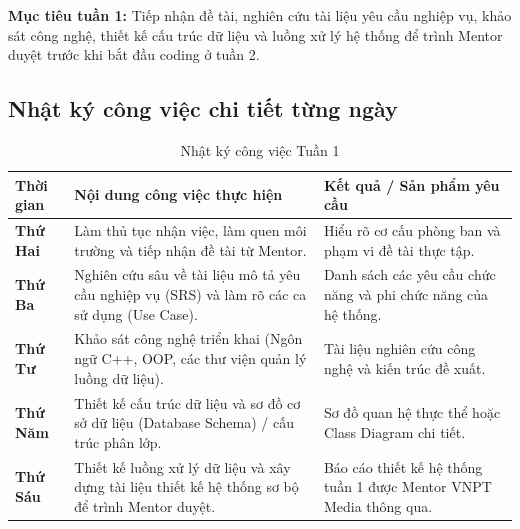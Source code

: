 \documentclass[12pt,a4paper]{article}
\begin{document}
\begin{weekframe}
\textbf{Mục tiêu tuần 1:} Tiếp nhận đề tài, nghiên cứu tài liệu yêu cầu nghiệp vụ, khảo sát công nghệ, thiết kế cấu trúc dữ liệu và luồng xử lý hệ thống để trình Mentor duyệt trước khi bắt đầu coding ở tuần 2.
\end{weekframe}

\vspace{0.5cm}

\subsection{Nhật ký công việc chi tiết từng ngày}

\begin{table}[H]
    \centering
    \renewcommand{\arraystretch}{1.6}
    \begin{tabularx}{\textwidth}{|>{\bfseries\centering\arraybackslash}p{2cm}|>{\arraybackslash}X|>{\arraybackslash}p{4.5cm}|}
        \hline
        \rowcolor{lightblue}
        \textbf{Thời gian} & \textbf{Nội dung công việc thực hiện} & \textbf{Kết quả / Sản phẩm yêu cầu} \\
        \hline
        Thứ Hai &
        Làm thủ tục nhận việc, làm quen môi trường và tiếp nhận đề tài từ Mentor. &
        Hiểu rõ cơ cấu phòng ban và phạm vi đề tài thực tập. \\
        \hline
        Thứ Ba &
        Nghiên cứu sâu về tài liệu mô tả yêu cầu nghiệp vụ (SRS) và làm rõ các ca sử dụng (Use Case). &
        Danh sách các yêu cầu chức năng và phi chức năng của hệ thống. \\
        \hline
        Thứ Tư &
        Khảo sát công nghệ triển khai (Ngôn ngữ C++, OOP, các thư viện quản lý luồng dữ liệu). &
        Tài liệu nghiên cứu công nghệ và kiến trúc đề xuất. \\
        \hline
        Thứ Năm &
        Thiết kế cấu trúc dữ liệu và sơ đồ cơ sở dữ liệu (Database Schema) / cấu trúc phân lớp. &
        Sơ đồ quan hệ thực thể hoặc Class Diagram chi tiết. \\
        \hline
        Thứ Sáu &
        Thiết kế luồng xử lý dữ liệu và xây dựng tài liệu thiết kế hệ thống sơ bộ để trình Mentor duyệt. &
        Báo cáo thiết kế hệ thống tuần 1 được Mentor VNPT Media thông qua. \\
        \hline
    \end{tabularx}
    \caption{Nhật ký công việc Tuần 1}
    \label{tab:week1_log}
\end{table}
\end{document}
